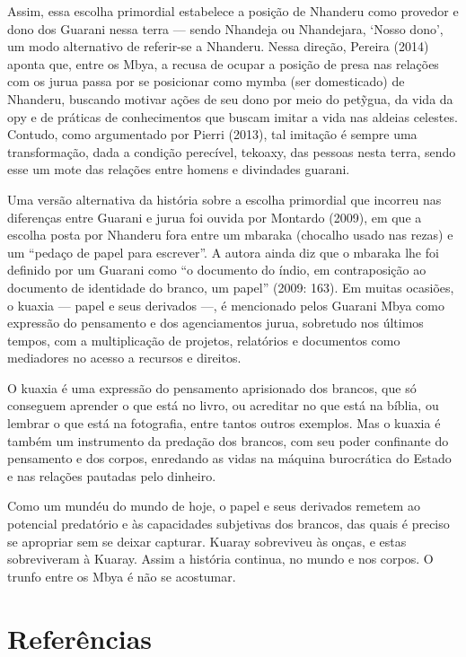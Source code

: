 Assim, essa escolha primordial estabelece a posição de Nhanderu como
provedor e dono dos Guarani nessa terra --- sendo Nhandeja ou Nhandejara,
‘Nosso dono’, um modo alternativo de referir-se a Nhanderu. Nessa
direção, Pereira (2014) aponta que, entre os Mbya, a recusa de ocupar a
posição de presa nas relações com os jurua passa por se posicionar como
mymba (ser domesticado) de Nhanderu, buscando motivar ações de seu dono
por meio do pet\~{y}gua, da vida da opy e de práticas de conhecimentos
que buscam imitar a vida nas aldeias celestes. Contudo, como
argumentado por Pierri (2013), tal imitação é sempre uma transformação,
dada a condição perecível, tekoaxy, das pessoas nesta terra, sendo esse
um mote das relações entre homens e divindades guarani.

Uma versão alternativa da história sobre a escolha primordial que
incorreu nas diferenças entre Guarani e jurua foi ouvida por Montardo
(2009), em que a escolha posta por Nhanderu fora entre um mbaraka
(chocalho usado nas rezas) e um ``pedaço de papel para escrever''. A
autora ainda diz que o mbaraka lhe foi definido por um Guarani como ``o
documento do índio, em contraposição ao documento de identidade do
branco, um papel'' (2009: 163). Em muitas ocasiões, o kuaxia --- papel e
seus derivados ---, é mencionado pelos Guarani Mbya como expressão do
pensamento e dos agenciamentos jurua, sobretudo nos últimos tempos, com
a multiplicação de projetos, relatórios e documentos como mediadores no
acesso a recursos e direitos.

O kuaxia é uma expressão do pensamento aprisionado dos brancos, que só
conseguem aprender o que está no livro, ou acreditar no que está na
bíblia, ou lembrar o que está na fotografia, entre tantos outros
exemplos. Mas o kuaxia é também um instrumento da predação dos brancos,
com seu poder confinante do pensamento e dos corpos, enredando as vidas
na máquina burocrática do Estado e nas relações pautadas pelo dinheiro.


Como um mundéu do mundo de hoje, o papel e seus derivados remetem ao
potencial predatório e às capacidades subjetivas dos brancos, das quais
é preciso se apropriar sem se deixar capturar. Kuaray sobreviveu às
onças, e estas sobreviveram à Kuaray. Assim a história continua, no
mundo e nos corpos. O trunfo entre os Mbya é não se acostumar.

\section{Referências}  

